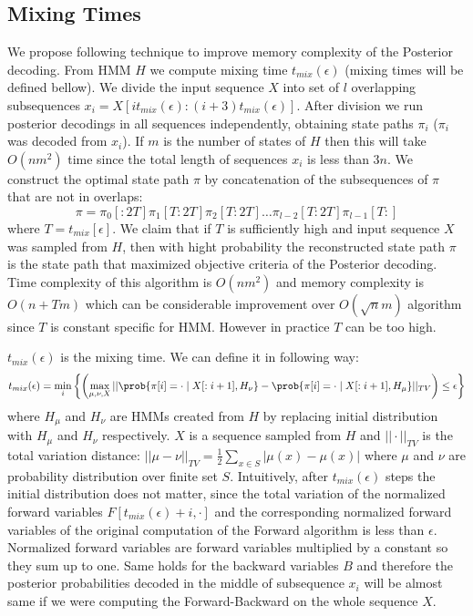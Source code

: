 \subsection{Mixing Times}

\def\tmix{t_{mix}(\epsilon)}
We propose following technique to improve memory complexity of the
Posterior decoding.  From HMM $H$ we compute mixing time
$t_{mix}(\epsilon)$ (mixing times will be defined bellow).  We divide the input
sequence $X$ into set of $l$ overlapping subsequences
$x_i=X[it_{mix}(\epsilon):(i+3)t_{mix}(\epsilon)]$.
After division we run posterior decodings in all sequences independently,
obtaining state paths $\pi_i$ ($\pi_i$ was decoded from $x_i$). If $m$ is the
number of states of $H$ then this will take $O(nm^2)$ time since the total
length of sequences $x_i$ is less than $3n$.  We construct the optimal state
path $\pi$ by concatenation of the subsequences of $\pi$ that are not in
overlaps: \[\pi = \pi_0[:2T] \pi_1[T:2T] \pi_2[T:2T] \dots
\pi_{l-2}[T:2T] \pi_{l-1}[T:]\] where $T=t_{mix}[\epsilon]$. We claim that
if $T$ is sufficiently high and input sequence $X$ was sampled from $H$, then
with hight probability the reconstructed state path $\pi$ is the state path that
maximized objective criteria of the Posterior decoding.  Time complexity of this
algorithm is $O(nm^2)$ and memory complexity is $O(n+Tm)$ which can be
considerable improvement over $O(\sqrt n m)$ algorithm since $T$ is constant
specific for HMM. However in practice $T$ can be too high.

$\tmix$ is the mixing time. We can define it in following way:
\[\tmix = \min_{i}\left\{ 
\left(\max_{\mu,\nu,X} || \prob{\pi[i] = \cdot\mid X[:i+1],H_\nu} - \prob{\pi[i] = \cdot\mid
X[:i+1],H_\mu}||_{TV}\right)\leq \epsilon
\right\}
\] 
where $H_\mu$ and $H_\nu$ are HMMs created from $H$ by replacing initial
distribution with $H_\mu$ and $H_\nu$ respectively.
$X$ is a sequence
sampled from $H$ and $||\cdot||_{TV}$ is the total variation distance:
$||\mu-\nu||_{TV}=\frac12\sum_{x\in S}|\mu(x)-\mu(x)|$ where $\mu$ and $\nu$
are probability distribution over finite set $S$.
Intuitively, after $\tmix$ steps the initial distribution does not matter, since
the total variation of the normalized forward variables $F[\tmix+i,\cdot]$
and the corresponding normalized forward variables of the original computation
of the Forward algorithm is less than $\epsilon$. Normalized forward variables
are forward variables multiplied by a constant so they sum up to one. 
Same holds for the backward
variables $B$ and therefore the posterior probabilities decoded in the middle of
subsequence $x_i$ will be almost same if we were computing the Forward-Backward
on the whole sequence $X$.


